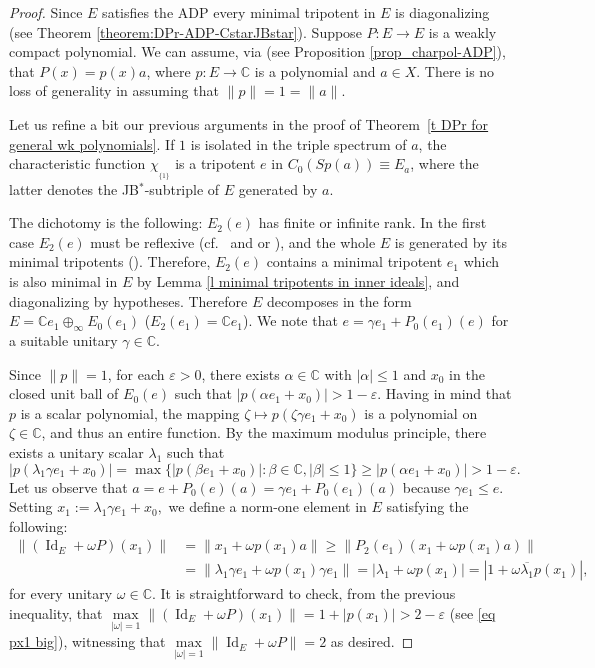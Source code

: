 \documentclass[10pt]{amsart}
\DeclareMathOperator{\id}{Id}
\begin{document}
	
	\begin{proof} Since $E$ satisfies the ADP every minimal tripotent in $E$ is diagonalizing (see Theorem \ref{theorem:DPr-ADP-CstarJBstar}). Suppose $P\colon E\longrightarrow E$ is a weakly compact polynomial. We can assume, via \cite[Corollary 1.2]{ChoGarMaestreMartin2007} (see Proposition \ref{prop_charpol-ADP}), that $P(x) =  p(x) a$, where $p\colon E\longrightarrow \mathbb{C}$ is a polynomial and $a\in X$. There is no loss of generality in assuming that $\|p\| = 1= \|a\|$.
		
		Let us refine a bit our previous arguments in the proof of Theorem~\ref{t DPr for general wk polynomials}. If $1$ is isolated in the triple spectrum of $a$, the characteristic function $\chi_{_{\{1\}}}$ is a tripotent $e$ in $C_0(Sp(a))\equiv E_a$, where the latter denotes the JB$^*$-subtriple of $E$ generated by $a$.
		
		The dichotomy is the following: $E_2(e)$ has finite or infinite rank. In the first case $E_2(e)$ must be reflexive (cf.\ \cite[Proposition 4.5]{BuChu92} and \cite[Theorem 6]{ChuIo90} or \cite{BeLoRo03, BeLoPeRo04}), and the whole $E$ is generated by its minimal tripotents (\cite[Proposition 4.5 and Remark~4.6]{BuChu92}). Therefore, $E_2(e)$ contains a minimal tripotent $e_1$ which is also minimal in $E$ by Lemma \ref{l minimal tripotents in inner ideals}, and diagonalizing by hypotheses. Therefore $E$ decomposes in the form $E= \mathbb{C} e_1 \oplus_{\infty} E_0(e_1)$ ($E_2(e_1) = \mathbb{C} e_1$). We note that $e = \gamma e_1 + P_0(e_1) (e)$ for a suitable unitary $\gamma\in \mathbb{C}$.
		
		Since $\|p\|=1$, for each $\varepsilon>0$, there exists $\alpha\in \mathbb{C}$ with $|\alpha|\leq 1$ and $x_0$ in the closed unit ball of $E_0(e)$ such that $|p(\alpha e_1 + x_0)|> 1-\varepsilon$. Having in mind that $p$ is a scalar polynomial, the mapping $\zeta \longmapsto  p(\zeta \gamma e_1 + x_0)$ is a polynomial on $\zeta\in \mathbb{C}$, and thus an entire function. By the maximum modulus principle, there exists a unitary scalar $\lambda_1$ such that \begin{equation}\label{eq px1 big} |p(\lambda_1 \gamma e_1 + x_0)| = \max\bigl\{|p(\beta e_1 + x_0)| \colon \beta \in \mathbb{C}, |\beta|\leq 1\bigr\} \geq |p(\alpha e_1 + x_0)| > 1-\varepsilon.
		\end{equation} Let us observe that $a = e+ P_0 (e) (a)= \gamma e_1  + P_0(e_1) (a)$ because $\gamma e_1\leq e$. Setting $x_1 := \lambda_1 \gamma e_1 + x_0,$ we define a norm-one element in $E$ satisfying the following:
		$$\begin{aligned} \|(\id_{E} +\omega P)(x_1)\|&= \|x_1 +\omega p(x_1) a \| \geq \| P_2(e_1) (x_1 +\omega p(x_1) a  )\| \\ &= \| \lambda_1 \gamma e_1 + \omega p(x_1) \gamma e_1  \| =  | \lambda_1 + \omega p(x_1) | = | 1 + \omega \overline{\lambda_1} p(x_1) |,
		\end{aligned}$$ for every unitary $\omega\in \mathbb{C}$. It is straightforward to check, from the previous inequality, that $\max\limits_{|\omega|=1} \|(\id_{E} +\omega P)(x_1)\| = 1 + | p(x_1) |> 2- \varepsilon$ (see \eqref{eq px1 big}), witnessing that $\max\limits_{|\omega|=1} \|\id_{E} +\omega P\| = 2$ as desired.
		

\end{proof}
\end{document}

